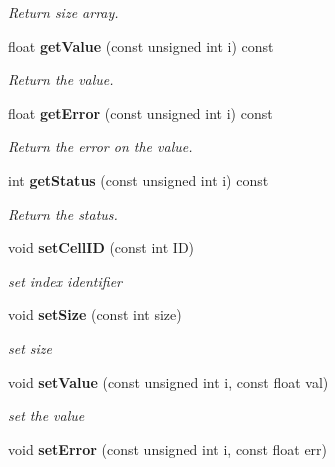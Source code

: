 \begin{DoxyCompactItemize}
\begin{DoxyCompactList}\small\item\em Return size array. \end{DoxyCompactList}\item 
float {\bf get\-Value} (const unsigned int i) const \label{classCALICE_1_1SimpleValueVector_afc51755de318aad884abd119ba5f6a60}

\begin{DoxyCompactList}\small\item\em Return the value. \end{DoxyCompactList}\item 
float {\bf get\-Error} (const unsigned int i) const \label{classCALICE_1_1SimpleValueVector_aaa1ef44b64800f632c44ee5e6415e5cf}

\begin{DoxyCompactList}\small\item\em Return the error on the value. \end{DoxyCompactList}\item 
int {\bf get\-Status} (const unsigned int i) const \label{classCALICE_1_1SimpleValueVector_abeb48e79ede23512335a9b4c4a094e4b}

\begin{DoxyCompactList}\small\item\em Return the status. \end{DoxyCompactList}\item 
void {\bf set\-Cell\-I\-D} (const int I\-D)\label{classCALICE_1_1SimpleValueVector_a4465a0dbf03078fe8a4aafde0c90b2c7}

\begin{DoxyCompactList}\small\item\em set index identifier \end{DoxyCompactList}\item 
void {\bf set\-Size} (const int size)\label{classCALICE_1_1SimpleValueVector_a4b34a565e96ed25beea6d42458167259}

\begin{DoxyCompactList}\small\item\em set size \end{DoxyCompactList}\item 
void {\bf set\-Value} (const unsigned int i, const float val)\label{classCALICE_1_1SimpleValueVector_a69145f7cac58a0b27195625af458e2af}

\begin{DoxyCompactList}\small\item\em set the value \end{DoxyCompactList}\item 
void {\bf set\-Error} (const unsigned int i, const float err)\label{classCALICE_1_1SimpleValueVector_aff7e70fd83747cd55597230fbd9ddcec}


\end{DoxyCompactItemize}

